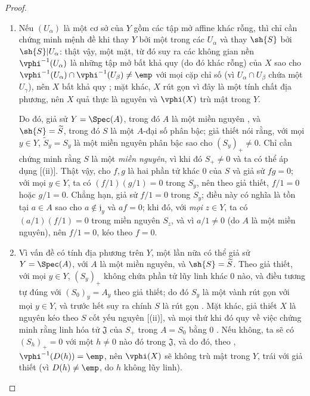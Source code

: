 \documentclass[oneside,10pt]{amsart}
\newcommand{\oldpage}[2][]{\marginnote{\normalfont\footnotesize\textbf{#1}~|~#2}\ignorespaces}
\begin{document}
\begin{proof}
\medskip\noindent
\begin{enumerate}
  \item[(i)] Nếu $(U_\alpha)$ là một cơ sở của $Y$ gồm các tập mở affine khác rỗng, thì chỉ cần chứng minh mệnh đề khi thay $Y$ bởi một trong các $U_\alpha$ và thay $\sh{S}$ bởi $\sh{S}|U_\alpha$:
    thật vậy, một mặt, từ đó suy ra các không gian nền $\vphi^{-1}(U_\alpha)$ là những tập mở bất khả quy (do đó khác rỗng) của $X$ sao cho $\vphi^{-1}(U_\alpha)\cap\vphi^{-1}(U_\beta)\neq\emp$ với mọi cặp chỉ số (vì $U_\alpha\cap U_\beta$ chứa một $U_\gamma$), nên $X$ bất khả quy ;
    mặt khác, $X$ rút gọn vì đây là một tính chất địa phương, nên $X$ quả thực là nguyên và $\vphi(X)$ trù mật trong $Y$.

    Do đó, giả sử $Y=\Spec(A)$, trong đó $A$ là một miền nguyên , và $\sh{S}=\widetilde{S}$, trong đó $S$ là một $A$-đại số phân bậc;
    giả thiết nói rằng, với mọi $y\in Y$, $\widetilde{S}_y=S_y$ là một miền nguyên phân bậc sao cho $(S_y)_+\neq0$.
    Chỉ cần chứng minh rằng $S$ là một \emph{miền nguyên}, vì khi đó $S_+\neq0$ và ta có thể áp dụng [(ii)].
    Thật vậy, cho $f,g$ là hai phần tử khác $0$ của $S$ và giả sử $fg=0$;
    với mọi $y\in Y$, ta có $(f/1)(g/1)=0$ trong $S_y$, nên theo giả thiết, $f/1=0$ hoặc $g/1=0$.
    Chẳng hạn, giả sử $f/1=0$ trong $S_y$;
    điều này có nghĩa là tồn tại $a\in A$ sao cho $a\notin\mathfrak{j}_y$ và $af=0$;
    khi đó, với \emph{mọi} $z\in Y$, ta có $(a/1)(f/1)=0$ trong miền nguyên $S_z$, và vì $a/1\neq0$ (do $A$ là một miền nguyên), nên $f/1=0$, kéo theo $f=0$.
  \item[(ii)] Vì vấn đề có tính địa phương trên $Y$, một lần nữa có thể giả sử $Y=\Spec(A)$, với $A$ là một miền nguyên, và $\sh{S}=\widetilde{S}$.
    Theo giả thiết, với mọi $y\in Y$, $(S_y)_+$ không chứa phần tử lũy linh khác $0$ nào, và điều tương tự đúng với $(S_0)_y=A_y$ theo giả thiết;
    do đó $S_y$ là một vành rút gọn với mọi $y\in Y$, và trước hết suy ra chính $S$ là rút gọn .
    Mặt khác, giả thiết $X$ là nguyên kéo theo $S$ cốt yếu nguyên [(ii)], và mọi thứ khi đó quy về việc chứng minh rằng linh hóa tử $\mathfrak{J}$ của $S_+$ trong $A=S_0$ bằng
\oldpage[II]{54}
$0$ .
Nếu không, ta sẽ có $(S_h)_+=0$ với một $h\neq0$ nào đó trong $\mathfrak{J}$, và do đó, theo , $\vphi^{-1}(D(h))=\emp$, nên $\vphi(X)$ sẽ không trù mật trong $Y$, trái với giả thiết (vì $D(h)\neq\emp$, do $h$ không lũy linh).
\end{enumerate}
\end{proof}
\end{document}
